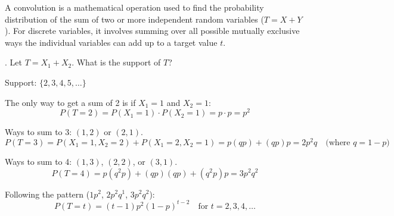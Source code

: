 \documentclass[12pt]{article}
\begin{document}

\begin{enumerate}


A convolution is a mathematical operation used to find the probability distribution of the sum of two or more independent random variables ($T = X + Y$). For discrete variables, it involves summing over all possible mutually exclusive ways the individual variables can add up to a target value $t$.

. Let $T = X_1 + X_2$. What is the support of $T$?

Support: $\{2, 3, 4, 5, \dots\}$


The only way to get a sum of 2 is if $X_1 = 1$ and $X_2 = 1$:$$P(T=2) = P(X_1=1) \cdot P(X_2=1) = p \cdot p = p^2$$


Ways to sum to 3: $(1,2)$ or $(2,1)$.$$P(T=3) = P(X_1=1, X_2=2) + P(X_1=2, X_2=1) = p(q p) + (q p)p = 2p^2q \quad \text{(where } q = 1-p\text{)}$$


Ways to sum to 4: $(1,3)$, $(2,2)$, or $(3,1)$.$$P(T=4) = p(q^2p) + (qp)(qp) + (q^2p)p = 3p^2q^2$$


Following the pattern ($1p^2$, $2p^2q^1$, $3p^2q^2$):$$P(T = t) = (t - 1)p^2(1-p)^{t-2} \quad \text{for } t = 2, 3, 4, \dots$$

\end{enumerate}
\end{document}
